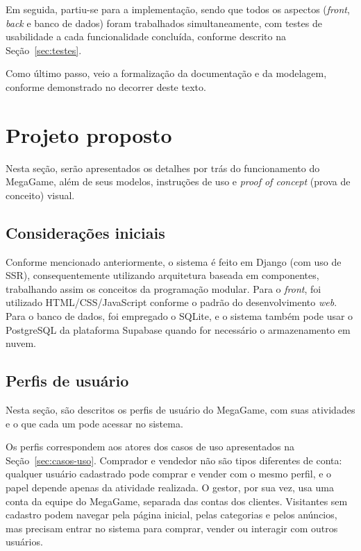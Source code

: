 \documentclass[
  12pt,
  a4paper,
  oneside,
  chapter=TITLE,
  subsection=TITLE,
  sumario=abnt-6027-2012,
  english,
  brazil
]{abntex2}
\begin{document}
Em seguida, partiu-se para a implementação, sendo que todos os aspectos (\emph{front},
\emph{back} e banco de dados) foram trabalhados simultaneamente, com
testes de usabilidade a cada funcionalidade concluída, conforme descrito
na Seção~\ref{sec:testes}.

Como último passo, veio a formalização da documentação e da modelagem,
conforme demonstrado no decorrer deste texto.

\chapter{Projeto proposto}

Nesta seção, serão apresentados os detalhes por trás do funcionamento do
MegaGame, além de seus modelos, instruções de uso e \emph{proof of
concept} (prova de conceito) visual.

\section{Considerações iniciais}

Conforme mencionado anteriormente, o sistema é feito
em Django (com uso de SSR), consequentemente utilizando arquitetura
baseada em componentes, trabalhando assim os conceitos da programação
modular. Para o \emph{front}, foi utilizado HTML/\allowbreak CSS/\allowbreak JavaScript conforme
o padrão do desenvolvimento \emph{web}. Para o banco de dados, foi
empregado o SQLite, e o sistema também pode usar o PostgreSQL da
plataforma Supabase quando for necessário o armazenamento em nuvem.

\section{Perfis de usuário}

Nesta seção, são descritos os perfis de usuário do MegaGame, com
suas atividades e o que cada um pode acessar no sistema.

Os perfis correspondem aos atores dos casos de uso apresentados na
Seção~\ref{sec:casos-uso}. Comprador e vendedor não são tipos diferentes
de conta: qualquer usuário cadastrado pode comprar e vender com o mesmo
perfil, e o papel depende apenas da atividade realizada. O gestor, por
sua vez, usa uma conta da equipe do MegaGame, separada das contas dos
clientes. Visitantes sem cadastro podem navegar pela página inicial,
pelas categorias e pelos anúncios, mas precisam entrar no sistema para
comprar, vender ou interagir com outros usuários.
\end{document}
